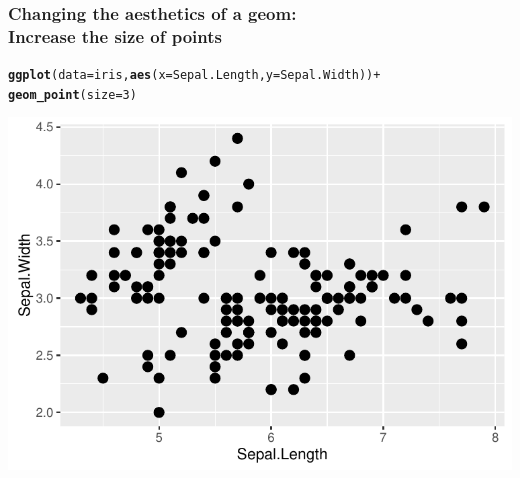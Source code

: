 \documentclass{beamer}\usepackage[]{graphicx}\usepackage[]{color}
\makeatletter
\newcommand{\hlnum}[1]{\textcolor[rgb]{0.686,0.059,0.569}{#1}}%
\newcommand{\hlopt}[1]{\textcolor[rgb]{0,0,0}{#1}}%
\newcommand{\hlstd}[1]{\textcolor[rgb]{0.345,0.345,0.345}{#1}}%
\newcommand{\hlkwc}[1]{\textcolor[rgb]{0.333,0.667,0.333}{#1}}%
\newcommand{\hlkwd}[1]{\textcolor[rgb]{0.737,0.353,0.396}{\textbf{#1}}}%
\newenvironment{kframe}{%
 \def\at@end@of@kframe{}%
 \ifinner\ifhmode%
  \def\at@end@of@kframe{\end{minipage}}%
  \begin{minipage}{\columnwidth}%
 \fi\fi%
 \def\FrameCommand##1{\hskip\@totalleftmargin \hskip-\fboxsep
 \colorbox{shadecolor}{##1}\hskip-\fboxsep
     \hskip-\linewidth \hskip-\@totalleftmargin \hskip\columnwidth}%
 \MakeFramed {\advance\hsize-\width
   \@totalleftmargin\z@ \linewidth\hsize
   \@setminipage}}%
 {\par\unskip\endMakeFramed%
 \at@end@of@kframe}
\newenvironment{knitrout}{}{} %
\makeatother
\begin{document}
\begin{frame}[fragile]
\frametitle{Changing the aesthetics of a geom: \\Increase the size of points}
\begin{knitrout}\footnotesize
{}\color{fgcolor}\begin{kframe}
\begin{alltt}
\hlkwd{ggplot}\hlstd{(}\hlkwc{data} \hlstd{= iris,} \hlkwd{aes}\hlstd{(}\hlkwc{x} \hlstd{= Sepal.Length,} \hlkwc{y} \hlstd{= Sepal.Width))} \hlopt{+}
    \hlkwd{geom_point}\hlstd{(}\hlkwc{size} \hlstd{=} \hlnum{3}\hlstd{)}
\end{alltt}
\end{kframe}

{\centering \includegraphics[width=.75\linewidth]{figure/first_plot_size-1} 

}



\end{knitrout}
\end{frame}

\end{document}

